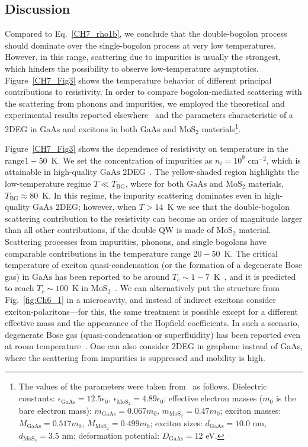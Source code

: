 \subsection{Discussion}
Compared to Eq.~\eqref{CH7_rho1b}, we conclude that the double-bogolon process should dominate over the single-bogolon process at very low temperatures.
However, in this range, scattering due to impurities is usually the strongest, which hinders the possibility to observe low-temperature asymptotics.
%
Figure~\ref{CH7_Fig3} shows the temperature behavior of different principal contributions to resistivity. In order to compare bogolon-mediated scattering with the scattering from phonons and impurities, we employed the theoretical and experimental results reported elsewhere~\cite{Kawamura:1992aa, Macleod:2009aa, Min:2012aa,Mendez:1984aa,Hirakawa:1986aa,Gold:1990aa}
and the parameters characteristic of a 2DEG in GaAs and excitons in both GaAs and MoS$_2$ materials\footnote{The values of the parameters were taken from~\cite{Kaasbjerg:2013aa,Basu:1980aa,Mair:1997pt} as follows.
Dielectric constants: $\epsilon_\textrm{GaAs}=12.5\epsilon_0$, $\epsilon_{\textrm{MoS}_2}=4.89\epsilon_0$; effective electron masses ($m_0$ is the bare electron mass): $m_\textrm{GaAs}=0.067m_0$, $m_{\textrm{MoS}_2}=0.47m_0$; exciton masses: $M_\textrm{GaAs}=0.517m_0$, $M_{\textrm{MoS}_2}=0.499m_0$; exciton sizes: $d_\textrm{GaAs}=10.0$ nm, $d_{\textrm{MoS}_2}=3.5$ nm; deformation potential: $D_\textrm{GaAs}=12$ eV.
}.

Figure~\ref{CH7_Fig3} shows the dependence of resistivity on temperature in the range$1-50$~K.
We set the concentration of impurities as $n_i=10^9$ cm$^{-2}$, which is attainable in high-quality $\textrm{GaAs}$ 2DEG~\cite{Hwang:2008ab,Manfra:2014aa}.
The yellow-shaded region highlights the low-temperature regime $T\ll T_\textrm{BG}$, where for both $\textrm{GaAs}$ and $\textrm{MoS}_2$ materials, $T_\textrm{BG}\approx 80$~K.
In this regime, the impurity scattering dominates even in high-quality $\textrm{GaAs}$ 2DEG;
however, when $T>14$~K we see that the double-bogolon scattering contribution to the resistivity can become an order of magnitude larger than all other contributions, if the double QW is made of $\textrm{MoS}_2$ material.
Scattering processes from impurities, phonons, and single bogolons have comparable contributions in the temperature range $20-50$~K.
The critical temperature of exciton quasi-condensation (or the formation of a degenerate Bose gas) in $\textrm{GaAs}$ has been reported to be around $T_c\sim 1-7$~K~\cite{Butov:2003aa}, and it is predicted to reach $T_c\sim 100$~K in $\textrm{MoS}_2$~\cite{Fogler:2014aa}.
We can alternatively put the structure from Fig.~\ref{fig:Ch6_1} in a microcavity, and instead of indirect excitons consider exciton-polaritons---for this, the same treatment is possible except for a different effective mass and the appearance of the Hopfield coefficients. In such a scenario, degenerate Bose gas (quasi-condensation or superfluidity) has been reported even at room temperature~\cite{Lerario:2017aa}.
One can also consider 2DEG in graphene instead of GaAs, where the scattering from impurities is suppressed and mobility is high.

